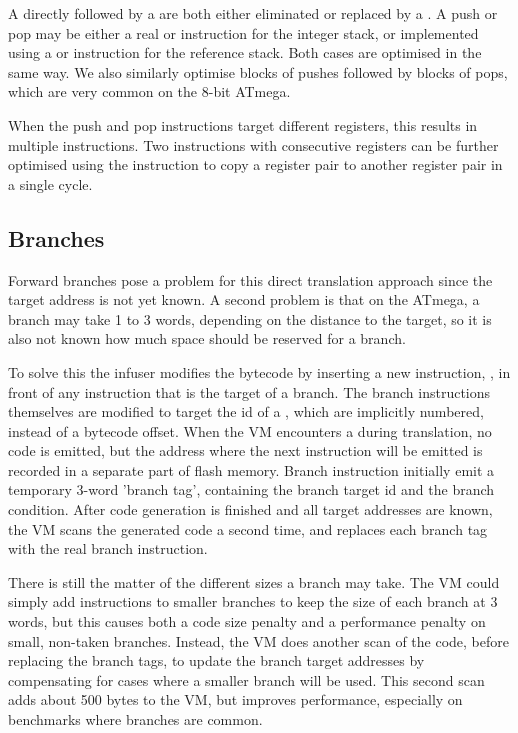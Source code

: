 A  directly followed by a  are both either eliminated or replaced by a . A push or pop may be either a real  or  instruction for the integer stack, or implemented using a  or  instruction for the reference stack. Both cases are optimised in the same way. We also similarly optimise blocks of pushes followed by blocks of pops, which are very common on the 8-bit ATmega. 

When the push and pop instructions target different registers, this results in multiple  instructions. Two  instructions with consecutive registers can be further optimised using the  instruction to copy a register pair to another register pair in a single cycle.


\subsection{Branches}
Forward branches pose a problem for this direct translation approach since the target address is not yet known. A second problem is that on the ATmega, a branch may take 1 to 3 words, depending on the distance to the target, so it is also not known how much space should be reserved for a branch.

To solve this the infuser modifies the bytecode by inserting a new instruction, , in front of any instruction that is the target of a branch. The branch instructions themselves are modified to target the id of a , which are implicitly numbered, instead of a bytecode offset. When the VM encounters a  during translation, no code is emitted, but the address where the next instruction will be emitted is recorded in a separate part of flash memory. Branch instruction initially emit a temporary 3-word 'branch tag', containing the branch target id and the branch condition. After code generation is finished and all target addresses are known, the VM scans the generated code a second time, and replaces each branch tag with the real branch instruction.

There is still the matter of the different sizes a branch may take. The VM could simply add  instructions to smaller branches to keep the size of each branch at 3 words, but this causes both a code size penalty and a performance penalty on small, non-taken branches. Instead, the VM does another scan of the code, before replacing the branch tags, to update the branch target addresses by compensating for cases where a smaller branch will be used. This second scan adds about 500 bytes to the VM, but improves performance, especially on benchmarks where branches are common.


